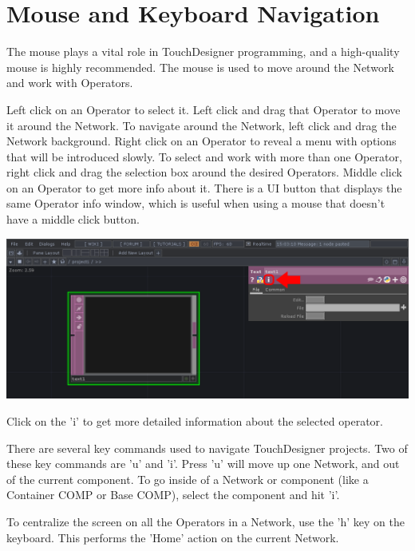 \section{Mouse and Keyboard Navigation}
\begin{fullwidth}
The mouse plays a vital role in TouchDesigner programming, and a high-quality mouse is highly recommended. The mouse is used to move around the Network and work with Operators. 

Left click on an Operator to select it. Left click and drag that Operator to move it around the Network. To navigate around the Network, left click and drag the Network background. Right click on an Operator to reveal a menu with options that will be introduced slowly. To select and work with more than one Operator, right click and drag the selection box around the desired Operators. Middle click on an Operator to get more info about it. There is a UI button that displays the same Operator info window, which is useful when using a mouse that doesn't have a middle click button.

\begin{center}
\includegraphics{./img/1.3/navigation-1.png}
\end{center}

Click on the 'i' to get more detailed information about the selected operator.

There are several key commands used to navigate TouchDesigner projects. Two of these key commands are 'u' and 'i'. Press 'u' will move up one Network, and out of the current component. To go inside of a Network or component (like a Container COMP or Base COMP), select the component and hit 'i'.

To centralize the screen on all the Operators in a Network, use the 'h' key on the keyboard. This performs the 'Home' action on the current Network. 

\end{fullwidth}


